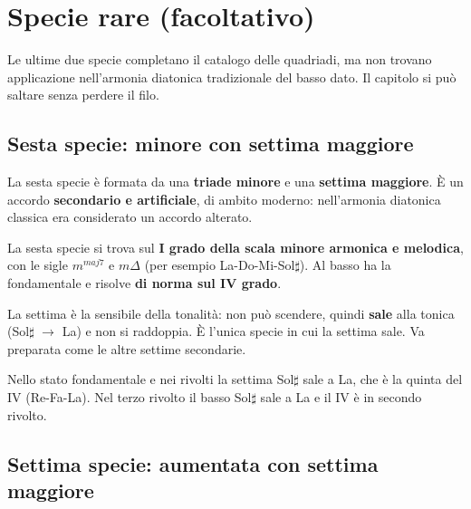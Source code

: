 \chapter{Specie rare (facoltativo)}
\label{chap:specie_rare}

Le ultime due specie completano il catalogo delle quadriadi, ma non trovano applicazione nell'armonia diatonica tradizionale del basso dato. Il capitolo si può saltare senza perdere il filo.

\section{Sesta specie: minore con settima maggiore}
\label{sec:sesta_specie_dettaglio}

La sesta specie è formata da una \textbf{triade minore} e una \textbf{settima maggiore}. È un accordo \textbf{secondario e artificiale}, di ambito moderno: nell'armonia diatonica classica era considerato un accordo alterato.

\begin{regola}
	\label{reg:sesta_specie}
	La sesta specie si trova sul \textbf{I grado della scala minore armonica e melodica}, con le sigle $m^{maj7}$ e $m\Delta$ (per esempio La-Do-Mi-Sol$\sharp$). Al basso ha la fondamentale e risolve \textbf{di norma sul IV grado}.
\end{regola}

La settima è la sensibile della tonalità: non può scendere, quindi \textbf{sale} alla tonica (Sol$\sharp$ $\rightarrow$ La) e non si raddoppia. È l'unica specie in cui la settima sale. Va preparata come le altre settime secondarie.

\begin{esempio}
	\label{ex:sesta_specie}
	Nello stato fondamentale e nei rivolti la settima Sol$\sharp$ sale a La, che è la quinta del IV (Re-Fa-La). Nel terzo rivolto il basso Sol$\sharp$ sale a La e il IV è in secondo rivolto.
\end{esempio}

\section{Settima specie: aumentata con settima maggiore}
\label{sec:settima_specie_dettaglio}

